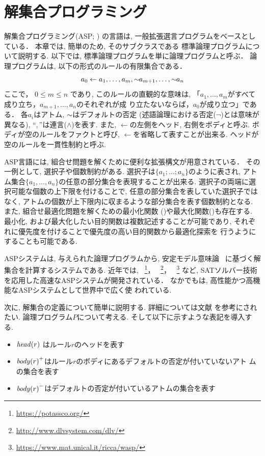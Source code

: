 \chapter{解集合プログラミング}\label{chap:asp}

解集合プログラミング(ASP; \cite{%
  Baral03:cambridge,%
  Gelfond88:iclp,%
  Inoue08:jssst,%
  Niemela99:amai})
の言語は, 一般拡張選言プログラムをベースとしている．
本章では, 簡単のため, そのサブクラスである
標準論理プログラムについて説明する. 
以下では, 標準論理プログラムを単に論理プログラムと呼ぶ．
論理プログラムは, 以下の形式のルールの有限集合である．
\begin{displaymath}
  \label{eq:rule}
  a_0\leftarrow a_1,\dots,a_m,{\sim\!\!{a_{m+1}}},\dots,{\sim\!\!{a_n}}
\end{displaymath}
ここで，
$0\leq m\leq n$ であり, 
このルールの直観的な意味は, 
「$a_1,\ldots,a_m$がすべて成り立ち，$a_{m+1},\ldots,a_n$のそれぞれが成
り立たないならば，$a_0$が成り立つ」である．
各$a_i$はアトム, 
${\sim\!\!{}}$はデフォルトの否定 (述語論理における否定($\neg$)とは意味が異なる), 
``$,$''は連言($\land$)を表す. 
また, $\leftarrow$の左側をヘッド, 右側をボディと呼ぶ. 
ボディが空のルールをファクトと呼び, 
$\leftarrow$を省略して表すことが出来る. 
ヘッドが空のルールを一貫性制約と呼ぶ.

ASP言語には, 組合せ問題を解くために便利な拡張構文が用意されている．
その一例として, 選択子や個数制約がある. 
選択子は\(\{a_1;\dots;a_n\}\)のように表され, アトム集合\(\{a_1,\dots,a_n\}\)の任意の部分集合を表現することが出来る. 
選択子の両端に選択可能な個数の上下限を付けることで, 
任意の部分集合を表していた選択子ではなく, 
アトムの個数が上下限内に収まるような部分集合を表す個数制約となる. 
また, 組合せ最適化問題を解くための最小化関数
()や最大化関数()も存在する. 
最小化, および最大化したい目的関数は複数記述することが可能であり, 
それぞれに優先度を付けることで優先度の高い目的関数から最適化探索を
行うようにすることも可能である. 

ASPシステムは, 与えられた論理プログラムから, 
安定モデル意味論~\cite{Gelfond88:iclp}
に基づく解集合を計算するシステムである. 
近年では, 
{\clingo}~\footnote{\url{https://potassco.org/}}，
{\dlv}~\footnote{\url{http://www.dlvsystem.com/dlv/}}，
{\wasp}~\footnote{\url{https://www.mat.unical.it/ricca/wasp/}}
など, SATソルバー技術を応用した高速なASPシステムが開発されている．
なかでも{\clingo}は, 高性能かつ高機能なASPシステムとして世界中で広く使
われている. 

次に, 解集合の定義について簡単に説明する. 
詳細については文献
\cite{%
  Baral03:cambridge,%
  Gelfond88:iclp,%
  Inoue08:jssst,%
  Niemela99:amai}
 を参考にされたい. 
 論理プログラム$P$について考える. 
そして以下に示すような表記を導入する. 
\begin{itemize}
\item $\mathit{head}(r)$ はルール$r$のヘッドを表す
\item ${\mathit{body}(r)}^+$はルール$r$のボディにあるデフォルトの否定が付いていないアト
ムの集合を表す
\item ${\mathit{body}(r)}^-$はデフォルトの否定が付いているアトムの集合を表す
\end{itemize}

